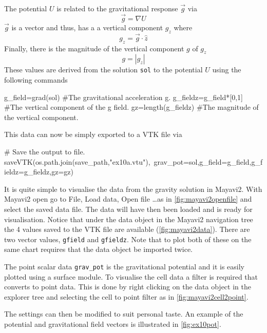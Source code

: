 The potential $U$ is related to the gravitational response $\vec{g}$ via
\begin{equation}
\vec{g} = \nabla U
\end{equation}
$\vec{g}$ is a vector and thus, has a a vertical component $g_{z}$ where
\begin{equation}
g_{z}=\vec{g}\cdot\hat{z}
\end{equation}
Finally, there is the magnitude of the vertical component $g$ of
$g_{z}$
\begin{equation}
g=|g_{z}|
\end{equation}
These values are derived from the \esc solution \verb!sol! to the potential $U$
using the following commands
\begin{python}
g_field=grad(sol) #The gravitational acceleration g.
g_fieldz=g_field*[0,1] #The vertical component of the g field.
gz=length(g_fieldz) #The magnitude of the vertical component.
\end{python}
This data can now be simply exported to a VTK file via
\begin{python}
# Save the output to file.
saveVTK(os.path.join(save_path,"ex10a.vtu"),\
        grav_pot=sol,g_field=g_field,g_fieldz=g_fieldz,gz=gz)
\end{python}

It is quite simple to visualise the data from the gravity solution in Mayavi2.
With Mayavi2 open go to File, Load data, Open file \ldots as in
\autoref{fig:mayavi2openfile} and select the saved data file. The data will
have then been loaded and is ready for visualisation. Notice that under the data
object in the Mayavi2 navigation tree the 4 values saved to the VTK file are
available (\autoref{fig:mayavi2data}). There are two vector values,
\verb|gfield| and \verb|gfieldz|. Note that to plot both of these on the same
chart requires that the data object be imported twice.

The point scalar data \verb|grav_pot| is the gravitational potential and it is
easily plotted using a surface module. To visualise the cell data a filter is
required that converts to point data. This is done by right clicking on the data
object in the explorer tree and selecting the cell to point filter as in
\autoref{fig:mayavi2cell2point}.

The settings can then be modified to suit personal taste. An example of the
potential and gravitational field vectors is illustrated in
\autoref{fig:ex10pot}.

